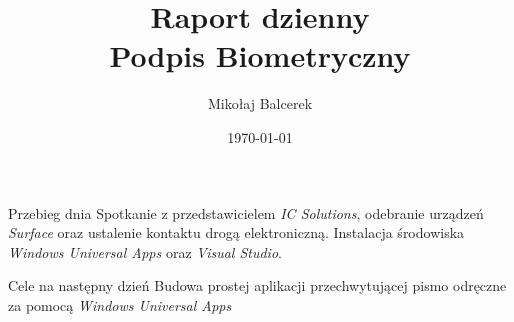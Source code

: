 \documentclass[titlepage]{mwart}
\date{\today}
\author{Mikołaj Balcerek}
\title{\textbf{Raport dzienny} \\
	Podpis Biometryczny
}
\begin{document}
\maketitle
\begin{section}{Przebieg dnia}
	Spotkanie z przedstawicielem \emph{IC Solutions}, odebranie urządzeń \emph{Surface} oraz ustalenie kontaktu drogą elektroniczną. Instalacja środowiska \emph{Windows Universal Apps} oraz \emph{Visual Studio}.
\end{section}
\begin{section}{Cele na następny dzień}
Budowa prostej aplikacji przechwytującej pismo odręczne za pomocą \emph{Windows Universal Apps}
\end{section}
\end{document}
